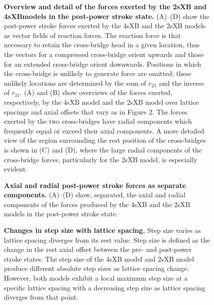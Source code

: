 \documentclass[10pt]{article}
\begin{document}
\begin{figure}[!ht]
    \begin{center}
    \end{center}
    \caption{ \textbf{Overview and detail of the forces exerted by the 2sXB and 4sXB\@ models in the post-power stroke state.}
        (A)--(D) show the post-power stroke forces exerted by the 4sXB and the 2sXB models as vector fields of reaction forces. 
        The reaction force is that necessary to retain the cross-bridge head in a given location, thus the vectors for a compressed cross-bridge orient upwards and those for an extended cross-bridge orient downwards.
        Positions in which the cross-bridge is unlikely to generate force are omitted; these unlikely locations are determined by the sum of $r_{23}$ and the inverse of $r_{31}$. 
        (A) and (B) show overviews of the forces exerted, respectively, by the 4sXB model and the 2sXB model over lattice spacings and axial offsets that vary as in Figure 2. 
        The forces exerted by the two cross-bridges have radial components which frequently equal or exceed their axial components. 
        A more detailed view of the region surrounding the rest position of the cross-bridges is shown in (C) and (D), where the large radial components of the cross-bridge forces, particularly for the 2sXB model, is especially evident.  
        }
    \label{fig_forces}
\end{figure}

\begin{figure}[!ht]
    \begin{center}
    \end{center}
    \caption{ \textbf{Axial and radial post-power stroke forces as separate components.}
        (A)--(D) show, separated, the axial and radial components of the forces produced by the 4sXB and the 2sXB models in the post-power stroke state.
        }
    \label{fig_force_contours}
\end{figure}

\begin{figure}[!ht]
    \begin{center}
    \end{center}
    \caption{ \textbf{Changes in step size with lattice spacing.}
        Step size varies as lattice spacing diverges from its rest value.
        Step size is defined as the change in the rest axial offset between the pre- and post-power stroke states. 
        The step size of the 4sXB model and 2sXB model produce different absolute step sizes as lattice spacing change.
        However, both models exhibit a local maximum step size at a specific lattice spacing with a decreasing step size as lattice spacing diverges from that point.
           }
    \label{fig_step_size}
\end{figure}
\end{document}
